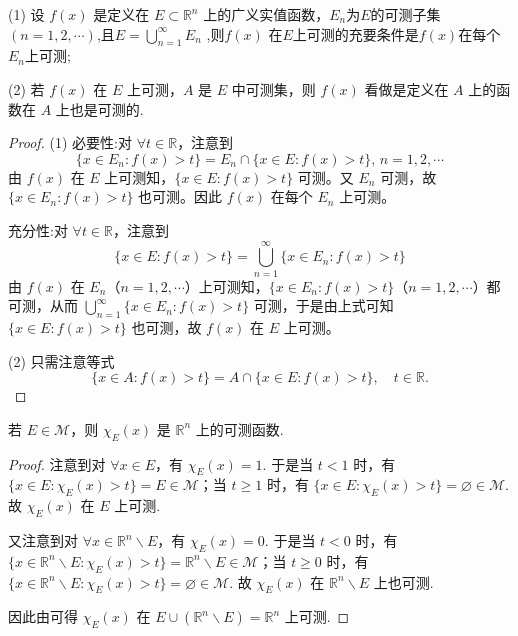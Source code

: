 \documentclass[../../main.tex]{subfiles}%
\begin{document}
\begin{theorem}\label{theorem:定理3.3}
(1) 设 \(f(x)\) 是定义在 \(E\subset \mathbb{R}^n\) 上的广义实值函数，$E_n$为$E$的可测子集$(n=1,2,\cdots)$,且$E=\bigcup_{n=1}^{\infty}E_n$ ,则\(f(x)\) 在$E$上可测的充要条件是\(f(x)\)在每个$E_n$上可测;

(2) 若 \(f(x)\) 在 \(E\) 上可测，\(A\) 是 \(E\) 中可测集，则 \(f(x)\) 看做是定义在 \(A\) 上的函数在 \(A\) 上也是可测的.
\end{theorem}
\begin{proof}

(1) {\heiti 必要性:}对 \( \forall t \in \mathbb{R} \)，注意到
\[
\{ x \in E_n : f(x) > t \} = E_n \cap \{ x \in E : f(x) > t \}, \, n = 1, 2, \cdots
\]
由 \( f(x) \) 在 \( E \) 上可测知，\( \{ x \in E : f(x) > t \} \) 可测。又 \( E_n \) 可测，故 \( \{ x \in E_n : f(x) > t \} \) 也可测。因此 \( f(x) \) 在每个 \( E_n \) 上可测。

{\heiti 充分性:}对 \( \forall t \in \mathbb{R} \)，注意到
\[
\{ x \in E : f(x) > t \} = \bigcup_{n = 1}^{\infty} \{ x \in E_n : f(x) > t \}
\]
由 \( f(x) \) 在 \( E_n \)（\( n = 1, 2, \cdots \)）上可测知，\( \{ x \in E_n : f(x) > t \} \)（\( n = 1, 2, \cdots \)）都可测，从而 \( \bigcup_{n = 1}^{\infty} \{ x \in E_n : f(x) > t \} \) 可测，于是由上式可知 \( \{ x \in E : f(x) > t \} \) 也可测，故 \( f(x) \) 在 \( E \) 上可测。

(2) 只需注意等式
\[
\{x \in A: f(x) > t\} = A \cap \{x \in E: f(x) > t\}, \quad t \in \mathbb{R}.
\]

\end{proof}

\begin{proposition}
若 \(E \in \mathscr{M}\)，则 \(\chi_E(x)\) 是 \(\mathbb{R}^n\) 上的可测函数. 
\end{proposition}
\begin{proof}

注意到对 \(\forall x \in E\)，有 \(\chi_E(x) = 1\). 于是当 \(t < 1\) 时，有 \(\{x \in E: \chi_E(x) > t\} = E \in \mathscr{M}\)；当 \(t \geqslant 1\) 时，有 \(\{x \in E: \chi_E(x) > t\} = \varnothing \in \mathscr{M}\). 故 \(\chi_E(x)\) 在 \(E\) 上可测.

又注意到对 \(\forall x \in \mathbb{R}^n \backslash E\)，有 \(\chi_E(x) = 0\). 于是当 \(t < 0\) 时，有 \(\{x \in \mathbb{R}^n \backslash E: \chi_E(x) > t\} = \mathbb{R}^n \backslash E \in \mathscr{M}\)；当 \(t \geqslant 0\) 时，有 \(\{x \in \mathbb{R}^n \backslash E: \chi_E(x) > t\} = \varnothing \in \mathscr{M}\). 故 \(\chi_E(x)\) 在 \(\mathbb{R}^n \backslash E\) 上也可测.

因此由可得 \(\chi_E(x)\) 在 \(E \cup (\mathbb{R}^n \backslash E) = \mathbb{R}^n\) 上可测.

\end{proof}
\end{document}
